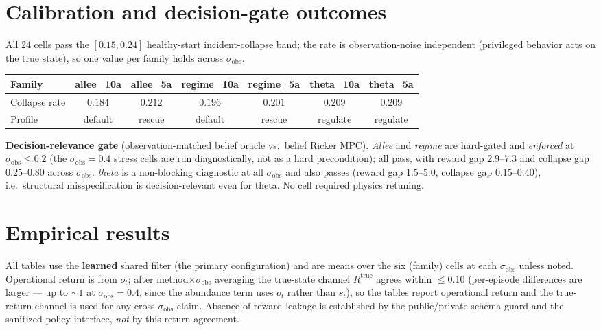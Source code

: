 \documentclass[11pt]{article}
\newcommand{\sobs}{\sigma_{\mathrm{obs}}}
\begin{document}
\section{Calibration and decision-gate outcomes}
All $24$ cells pass the $[0.15,0.24]$ healthy-start incident-collapse band; the
rate is observation-noise independent (privileged behavior acts on the true
state), so one value per family holds across $\sobs$.
\begin{longtable}{@{}lcccccc@{}}
\toprule
Family & allee\_10a & allee\_5a & regime\_10a & regime\_5a & theta\_10a & theta\_5a \\
\midrule
Collapse rate & $0.184$ & $0.212$ & $0.196$ & $0.201$ & $0.209$ & $0.209$ \\
Profile & default & rescue & default & rescue & regulate & regulate \\
\bottomrule
\end{longtable}
\noindent\textbf{Decision-relevance gate} (observation-matched belief oracle vs.\
belief Ricker MPC). \emph{Allee} and \emph{regime} are hard-gated and
\emph{enforced} at $\sobs\!\le\!0.2$ (the $\sobs{=}0.4$ stress cells are run
diagnostically, not as a hard precondition); all pass, with reward gap $2.9$--$7.3$
and collapse gap $0.25$--$0.80$ across $\sobs$. \emph{theta} is a non-blocking
diagnostic at all $\sobs$ and also passes (reward gap $1.5$--$5.0$, collapse gap
$0.15$--$0.40$), i.e.\ structural misspecification is decision-relevant even for
theta. No cell required physics retuning.

\section{Empirical results}
\label{sec:results}
All tables use the \textbf{learned} shared filter (the primary configuration) and
are means over the six (family) cells at each $\sobs$ unless noted. Operational
return is from $o_t$; after method$\times\sobs$ averaging the true-state channel
$R^{\mathrm{true}}$ agrees within $\le 0.10$ (per-episode differences are larger
--- up to $\sim 1$ at $\sobs{=}0.4$, since the abundance term uses $o_t$ rather
than $s_t$), so the tables report operational return and the true-return channel is
used for any cross-$\sobs$ claim. Absence of reward leakage is established by the
public/private schema guard and the sanitized policy interface, \emph{not} by this
return agreement.
\end{document}
